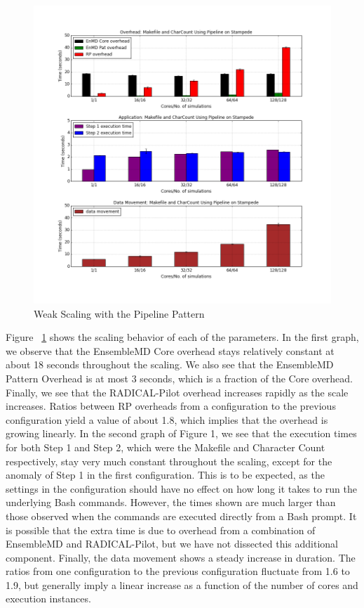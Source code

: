 \documentclass[]{article}
\begin{document}
			\begin{figure}[H]
				\centering
				\includegraphics[scale=.30]{img/pipeline_weak_scaling.png}
				\caption{Weak Scaling with the Pipeline Pattern}
				\label{fig:pipeline_weak_scaling}
			\end{figure}

			Figure ~\ref{fig:pipeline_weak_scaling} shows the scaling behavior of each of the parameters. In the first graph, we observe that the EnsembleMD Core overhead stays relatively constant at about 18 seconds throughout the scaling. We also see that the EnsembleMD Pattern Overhead is at most 3 seconds, which is a fraction of the Core overhead. Finally, we see that the RADICAL-Pilot overhead increases rapidly as the scale increases. Ratios between RP overheads from a configuration to the previous configuration yield a value of about 1.8, which implies that the overhead is growing linearly.
			In the second graph of Figure 1, we see that the execution times for both Step 1 and Step 2, which were the Makefile and Character Count respectively, stay very much constant throughout the scaling, except for the anomaly of Step 1 in the first configuration. This is to be expected, as the settings in the configuration should have no effect on how long it takes to run the underlying Bash commands. However, the times shown are much larger than those observed when the commands are executed directly from a Bash prompt. It is possible that the extra time is due to overhead from a combination of EnsembleMD and RADICAL-Pilot, but we have not dissected this additional component.
			Finally, the data movement shows a steady increase in duration. The ratios from one configuration to the previous configuration fluctuate from 1.6 to 1.9, but generally imply a linear increase as a function of the number of cores and execution instances. 
\end{document}
